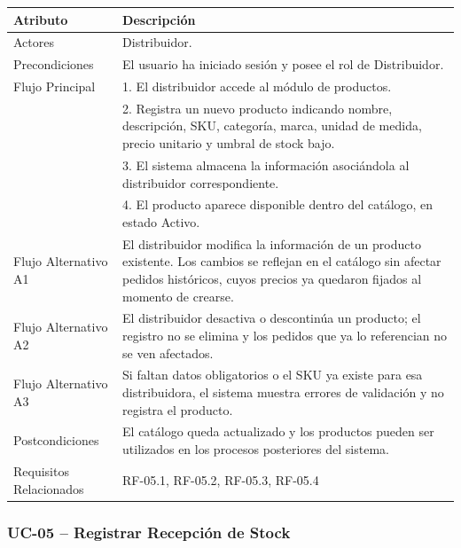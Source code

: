 \documentclass[12pt,a4paper]{report}
\begin{document}
\begin{longtable}{|p{4cm}|p{10cm}|}
\hline
\textbf{Atributo} & \textbf{Descripción} \\ \hline
Actores & Distribuidor. \\ \hline
Precondiciones & El usuario ha iniciado sesión y posee el rol de Distribuidor. \\ \hline
Flujo Principal &
1. El distribuidor accede al módulo de productos.\\
& 2. Registra un nuevo producto indicando nombre, descripción, SKU, categoría, marca, unidad de medida, precio unitario y umbral de stock bajo.\\
& 3. El sistema almacena la información asociándola al distribuidor correspondiente.\\
& 4. El producto aparece disponible dentro del catálogo, en estado Activo. \\ \hline
Flujo Alternativo A1 & El distribuidor modifica la información de un producto existente. Los cambios se reflejan en el catálogo sin afectar pedidos históricos, cuyos precios ya quedaron fijados al momento de crearse. \\ \hline
Flujo Alternativo A2 & El distribuidor desactiva o descontinúa un producto; el registro no se elimina y los pedidos que ya lo referencian no se ven afectados. \\ \hline
Flujo Alternativo A3 & Si faltan datos obligatorios o el SKU ya existe para esa distribuidora, el sistema muestra errores de validación y no registra el producto. \\ \hline
Postcondiciones & El catálogo queda actualizado y los productos pueden ser utilizados en los procesos posteriores del sistema. \\ \hline
Requisitos Relacionados & RF-05.1, RF-05.2, RF-05.3, RF-05.4 \\ \hline
\end{longtable}


\subsubsection{UC-05 -- Registrar Recepción de Stock}
\end{document}
